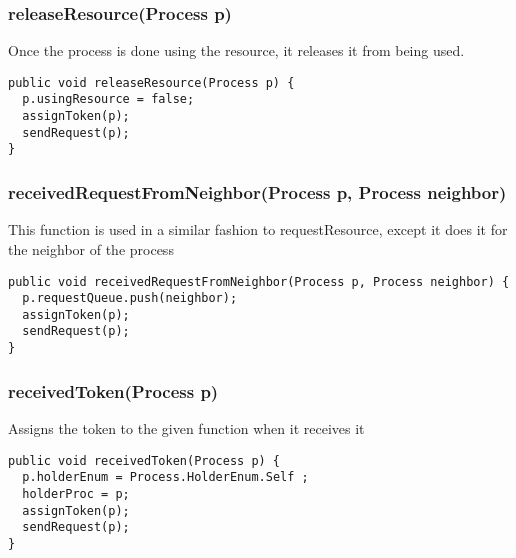 \documentclass{article}
\begin{document}
		\subsubsection{releaseResource(Process p)}
		Once the process is done using the resource, it releases it from being used.
		\begin{lstlisting}
public void releaseResource(Process p) {
  p.usingResource = false;
  assignToken(p);
  sendRequest(p);
}
		\end{lstlisting}
		
		\subsubsection{receivedRequestFromNeighbor(Process p, Process neighbor)}
		This function is used in a similar fashion to requestResource, except it does it for the neighbor of the process
		\begin{lstlisting}
public void receivedRequestFromNeighbor(Process p, Process neighbor) {
  p.requestQueue.push(neighbor);
  assignToken(p);
  sendRequest(p);
}
		\end{lstlisting}
		\subsubsection{receivedToken(Process p)}
		Assigns the token to the given function when it receives it
		\begin{lstlisting}
public void receivedToken(Process p) {
  p.holderEnum = Process.HolderEnum.Self ;
  holderProc = p;
  assignToken(p);
  sendRequest(p);		
}
		\end{lstlisting}
\end{document}
